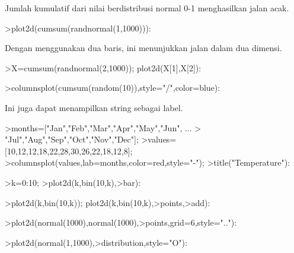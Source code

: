 \documentclass{article}
\begin{document}
\begin{eulernotebook}
\begin{eulercomment}
\begin{eulercomment}
\begin{eulercomment}
\begin{eulercomment}
\begin{eulercomment}
\begin{eulercomment}
\begin{eulercomment}
\begin{eulercomment}
\begin{eulercomment}
\begin{eulercomment}
\begin{eulercomment}
Jumlah kumulatif dari nilai berdistribusi normal 0-1 menghasilkan
jalan acak.
\end{eulercomment}
\begin{eulerprompt}
>plot2d(cumsum(randnormal(1,1000))):
\end{eulerprompt}
\begin{eulercomment}
Dengan menggunakan dua baris, ini menunjukkan jalan dalam dua dimensi.
\end{eulercomment}
\begin{eulerprompt}
>X=cumsum(randnormal(2,1000)); plot2d(X[1],X[2]):
\end{eulerprompt}
\begin{eulerprompt}
>columnsplot(cumsum(random(10)),style="/",color=blue):
\end{eulerprompt}
\begin{eulercomment}
Ini juga dapat menampilkan string sebagai label.
\end{eulercomment}
\begin{eulerprompt}
>months=["Jan","Feb","Mar","Apr","May","Jun", ...
>  "Jul","Aug","Sep","Oct","Nov","Dec"];
>values=[10,12,12,18,22,28,30,26,22,18,12,8];
>columnsplot(values,lab=months,color=red,style="-");
>title("Temperature"):
\end{eulerprompt}
\begin{eulerprompt}
>k=0:10;
>plot2d(k,bin(10,k),>bar):
\end{eulerprompt}
\begin{eulerprompt}
>plot2d(k,bin(10,k)); plot2d(k,bin(10,k),>points,>add):
\end{eulerprompt}
\begin{eulerprompt}
>plot2d(normal(1000),normal(1000),>points,grid=6,style=".."):
\end{eulerprompt}
\begin{eulerprompt}
>plot2d(normal(1,1000),>distribution,style="O"):
\end{eulerprompt}

\end{eulercomment}
\end{eulercomment}
\end{eulercomment}
\end{eulercomment}
\end{eulercomment}
\end{eulercomment}
\end{eulercomment}
\end{eulercomment}
\end{eulercomment}
\end{eulercomment}
\end{eulernotebook}
\end{document}
